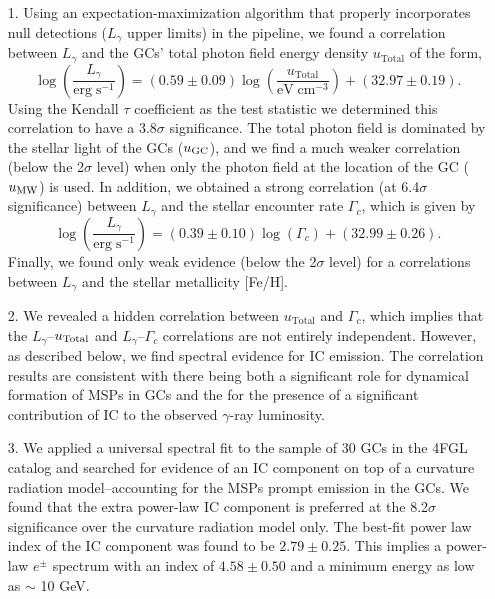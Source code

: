 \documentclass[doublespace,draft,nopageskip]{VTthesis} %
\begin{document}
\begin{itemize}
    \item[1.] Using an expectation-maximization algorithm that properly incorporates null detections ($L_\gamma$ upper limits) in the pipeline, we found a correlation between $L_\gamma$ and the GCs' total photon field energy density $u_\mathrm{Total}$ of the form, \begin{equation}
    \log\left(\frac{L_\gamma}{\mathrm{erg}\;\mathrm{s}^{-1}}\right) = (0.59 \pm 0.09)\log\left(\frac{u_\mathrm{Total}}{\mathrm{eV}\;\mathrm{cm}^{-3}}\right) + (32.97 \pm 0.19).
    \end{equation}
    Using the Kendall $\tau$ coefficient as the test statistic we determined this correlation to have a $3.8\sigma$ significance. The total photon field is dominated by the stellar light of the GCs  ($u_{\rm GC}$), and we find a much weaker correlation (below the 2$\sigma$ level) when only the photon field at the location of the GC ($u_{\rm MW}$) is used. In addition, we obtained a strong correlation (at 6.4$\sigma$ significance) between $L_\gamma$ and the stellar encounter rate $\Gamma_c$, which is given by 
    \begin{equation}
    \log\left(\frac{L_\gamma}{\mathrm{erg}\;\mathrm{s}^{-1}}\right) = (0.39 \pm 0.10)\log\left(\Gamma_c\right) + (32.99 \pm 0.26).
    \end{equation}
    Finally, we found only weak evidence (below the 2$\sigma$ level) for a correlations between $L_\gamma$ and the stellar metallicity [Fe/H].
    \item[2.] We revealed a hidden correlation between $u_\mathrm{Total}$ and $\Gamma_c$, which implies that the $L_\gamma$--$u_{\rm Total}$ and $L_\gamma$--$\Gamma_c$ correlations are not entirely independent. However, as described below, we find spectral evidence for IC emission. The correlation results are consistent with there being both a significant role for dynamical formation of MSPs in GCs and the for the presence of a significant contribution of IC to the observed $\gamma$-ray luminosity.
    \item[3.] We applied a universal spectral fit to the sample of 30 GCs in the 4FGL catalog and searched for evidence of an IC component on top of a curvature radiation model--accounting for the MSPs prompt emission in the GCs. We found that the extra power-law IC component is preferred at the 8.2$\sigma$ significance over the curvature radiation model only. The best-fit power law index of the IC component was found to be $2.79 \pm 0.25$. This implies a power-law $e^\pm$ spectrum with an index of $4.58 \pm 0.50$ and a minimum energy as low as $\sim$ 10 GeV. 

\end{itemize}
\end{document}

